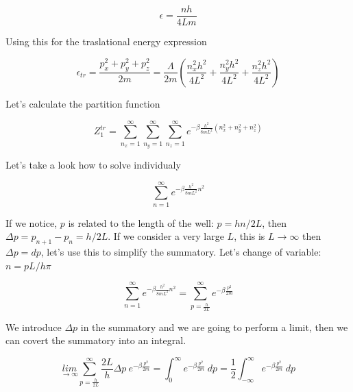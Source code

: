 \documentclass[12pt,a4paper]{report}
\newcommand{\esp}{\vspace{0.5cm}}
\begin{document}
	\esp
	
	\begin{equation}
		\epsilon = \frac{nh}{4Lm}
	\end{equation}
	
	\esp
	
	\noindent Using this for the traslational energy expression
	
	\esp
	
	\begin{equation}
		\epsilon_{tr} = \frac{p_x^2+p_y^2+p_z^2}{2m} = \frac{\Lambda}{2m}\left(\frac{n_x^2h^2}{4L^2}+\frac{n_y^2h^2}{4L^2}+\frac{n_z^2h^2}{4L^2}\right)
	\end{equation}
	
	\esp
	
	\noindent Let's calculate the partition function
	
	\esp
	
	\begin{equation}
		Z_1^{tr} = \sum_{n_x=1}^{\infty} \sum_{n_y=1}^{\infty} \sum_{n_z=1}^{\infty} e^{-\beta \frac{ h^2}{8mL^2} (n_x^2 + n_y^2 + n_z^2)}
	\end{equation}
	
	\esp
	
	\noindent Let's take a look how to solve individualy
	
	\esp
	
	\begin{equation}
		\sum_{n=1}^{\infty} e^{-\beta \frac{ h^2}{8mL^2}n^2}
	\end{equation}
	
	\esp
	
	If we notice, $p$ is related to the length of the well: $p=hn/2L$, then $\Delta p = p_{n+1}-p_n =h/2L$. If we consider a very large $L$, this is $L\rightarrow\infty$ then $\Delta p = dp$, let's use this to simplify the summatory. Let's change of variable: $n=pL/h\pi$
	
	\esp
	
	\begin{equation}
		\sum_{n=1}^{\infty} e^{-\beta \frac{ h^2}{8mL^2}n^2} = \sum_{p=\frac{h}{2L}}^{\infty} e^{-\beta \frac{p^2}{2m}}
	\end{equation}
	
	\esp
	
	\noindent We introduce $\Delta p$ in the summatory and we are going to perform a limit, then we can covert the summatory into an integral.
	
	\esp
	
	\begin{equation}
		\underset{\rightarrow \infty}{lim} \sum_{p=\frac{h}{2L}}^{\infty} \frac{2L}{h} \Delta p\ e^{-\beta \frac{p^2}{2m}} = \int_0^{\infty} e^{-\beta \frac{p^2}{2m}}\ dp = \frac{1}{2} \int_{-\infty}^{\infty} e^{-\beta \frac{p^2}{2m}}\ dp
	\end{equation}
	
\end{document}
